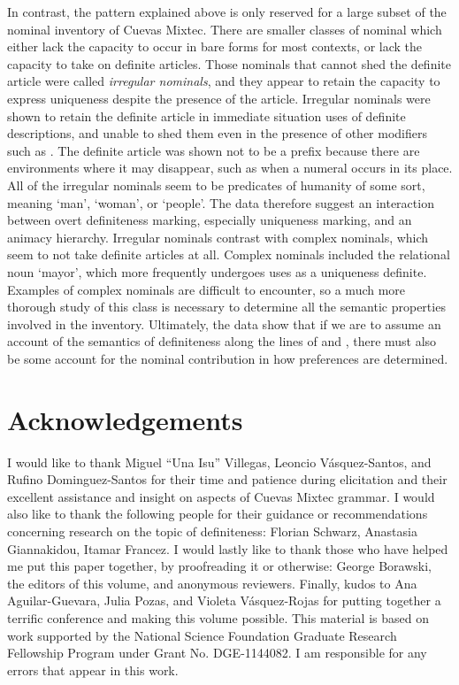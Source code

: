 \documentclass[output=paper,modfonts,nonflat]{langsci/langscibook}
\begin{document}
In contrast, the pattern explained above is only reserved for a large subset of the nominal inventory of Cuevas Mixtec.  There are smaller classes of nominal which either lack the capacity to occur in bare forms for most contexts, or lack the capacity to take on definite articles.  Those nominals that cannot shed the definite article were called \textit{irregular nominals}, and they appear to retain the capacity to express uniqueness despite the presence of the article.  Irregular nominals were shown to retain the definite article in immediate situation uses of definite descriptions, and unable to shed them even in the presence of other modifiers such as .  The definite article was shown not to be a prefix because there are environments where it may disappear, such as when a numeral occurs in its place.  All of the irregular nominals seem to be predicates of humanity of some sort, meaning `man', `woman', or `people'.  The data therefore suggest an interaction between overt definiteness marking, especially uniqueness marking, and an animacy hierarchy.  Irregular nominals contrast with complex nominals, which seem to not take definite articles at all.  Complex nominals included the relational noun `mayor', which more frequently undergoes uses as a uniqueness definite.  Examples of complex nominals are difficult to encounter, so a much more thorough study of this class is necessary to determine all the semantic properties involved in the inventory.  Ultimately, the data show that if we are to assume an account of the semantics of definiteness along the lines of \citeauthor{Schwarz2009} and \citeauthor{Jenks2015}, there must also be some account for the nominal contribution in how  preferences are determined.\newpage

\section*{Acknowledgements}

I would like to thank Miguel ``Una Isu'' Villegas, Leoncio V\'asquez-Santos, and Rufino Dominguez-Santos for their time and patience during elicitation and their excellent assistance and insight on aspects of Cuevas Mixtec grammar.  I would also like to thank the following people for their guidance or recommendations concerning research on the topic of definiteness: Florian Schwarz, Anastasia Giannakidou, Itamar Francez.  I would lastly like to thank those who have helped me put this paper together, by proofreading it or otherwise: George Borawski, the editors of this volume, and anonymous reviewers.  Finally, kudos to Ana Aguilar-Guevara, Julia Pozas, and Violeta V\'asquez-Rojas for putting together a terrific conference and making this volume possible.  This material is based on work supported by the National Science Foundation Graduate Research Fellowship Program under Grant No. DGE-1144082.  I am responsible for any errors that appear in this work.
\end{document}
